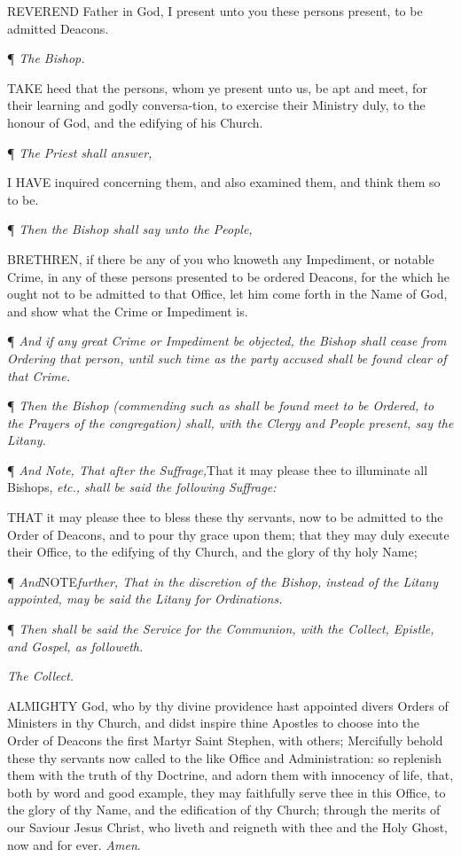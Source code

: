 REVEREND
Father in God, I present unto you these persons present, to be admitted
Deacons.

¶
\emph{The Bishop.}

TAKE
heed that the persons, whom ye present unto us, be apt and meet, for their
learning and godly conversa-tion, to exercise their Ministry duly, to
the honour of God, and the edifying of his Church.

¶
\emph{The Priest shall answer,}

I
HAVE inquired concerning them, and also examined them, and think them
so to be.

¶
\emph{Then the Bishop shall say unto the People,}

BRETHREN,
if there be any of you who knoweth any Impediment, or notable Crime, in
any of these persons presented to be ordered Deacons, for the which he
ought not to be admitted to that Office, let him come forth in the Name
of God, and show what the Crime or Impediment is.

¶
\emph{And if any great Crime or Impediment be objected, the Bishop shall
cease from Ordering that person, until such time as the party accused
shall be found clear of that Crime.}

¶ \emph{Then the Bishop (commending such as shall be found meet to
be Ordered, to the Prayers of the congregation) shall, with the Clergy
and People present, say the Litany.}

¶
\emph{And Note, That after the Suffrage,}That it may please thee to
illuminate all Bishops, \emph{etc., shall be said the following Suffrage:}

THAT
it may please thee to bless these thy servants, now to be admitted to
the Order of Deacons, and to pour thy grace upon them; that they may duly
execute their Office, to the edifying of thy Church, and the glory of
thy holy Name; 

¶
\emph{And}NOTE\emph{further, That in the discretion
of the Bishop, instead of the Litany appointed, may be said the Litany
for Ordinations.}

¶
\emph{Then shall be said the Service for the Communion, with the Collect,
Epistle, and Gospel, as followeth.}

\emph{The
Collect.}

ALMIGHTY
God, who by thy divine providence hast appointed divers Orders of Ministers
in thy Church, and didst inspire thine Apostles to choose into the Order
of Deacons the first Martyr Saint Stephen, with others; Mercifully behold
these thy servants now called to the like Office and Administration: so
replenish them with the truth of thy Doctrine, and adorn them with innocency
of life, that, both by word and good example, they may faithfully serve
thee in this Office, to the glory of thy Name, and the edification of
thy Church; through the merits of our Saviour Jesus Christ, who liveth
and reigneth with thee and the Holy Ghost, now and for ever. \emph{Amen}.

